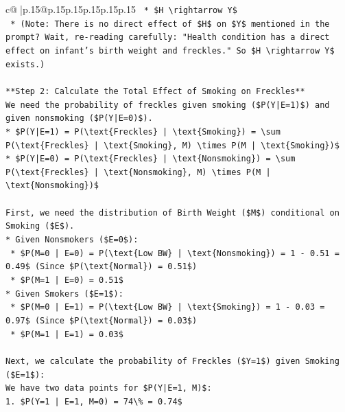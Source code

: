 \documentclass{article}
\begin{document}
{\begin{supertabular}{c@{$\;$}|p{.15\linewidth}@{}p{.15\linewidth}p{.15\linewidth}p{.15\linewidth}p{.15\linewidth}p{.15\linewidth}}
{{{\texttt{    *   \$H \textbackslash{}rightarrow Y\$} \\
\texttt{    *   (Note: There is no direct effect of \$H\$ on \$Y\$ mentioned in the prompt? Wait, re{-}reading carefully: "Health condition has a direct effect on infant's birth weight and freckles." So \$H \textbackslash{}rightarrow Y\$ exists.)} \\
\\ 
\texttt{**Step 2: Calculate the Total Effect of Smoking on Freckles**} \\
\texttt{We need the probability of freckles given smoking (\$P(Y|E=1)\$) and given nonsmoking (\$P(Y|E=0)\$).} \\
\texttt{*   \$P(Y|E=1) = P(\textbackslash{}text\{Freckles\} | \textbackslash{}text\{Smoking\}) = \textbackslash{}sum P(\textbackslash{}text\{Freckles\} | \textbackslash{}text\{Smoking\}, M) \textbackslash{}times P(M | \textbackslash{}text\{Smoking\})\$} \\
\texttt{*   \$P(Y|E=0) = P(\textbackslash{}text\{Freckles\} | \textbackslash{}text\{Nonsmoking\}) = \textbackslash{}sum P(\textbackslash{}text\{Freckles\} | \textbackslash{}text\{Nonsmoking\}, M) \textbackslash{}times P(M | \textbackslash{}text\{Nonsmoking\})\$} \\
\\ 
\texttt{First, we need the distribution of Birth Weight (\$M\$) conditional on Smoking (\$E\$).} \\
\texttt{*   Given Nonsmokers (\$E=0\$):} \\
\texttt{    *   \$P(M=0 | E=0) = P(\textbackslash{}text\{Low BW\} | \textbackslash{}text\{Nonsmoking\}) = 1 {-} 0.51 = 0.49\$ (Since \$P(\textbackslash{}text\{Normal\}) = 0.51\$)} \\
\texttt{    *   \$P(M=1 | E=0) = 0.51\$} \\
\texttt{*   Given Smokers (\$E=1\$):} \\
\texttt{    *   \$P(M=0 | E=1) = P(\textbackslash{}text\{Low BW\} | \textbackslash{}text\{Smoking\}) = 1 {-} 0.03 = 0.97\$ (Since \$P(\textbackslash{}text\{Normal\}) = 0.03\$)} \\
\texttt{    *   \$P(M=1 | E=1) = 0.03\$} \\
\\ 
\texttt{Next, we calculate the probability of Freckles (\$Y=1\$) given Smoking (\$E=1\$):} \\
\texttt{We have two data points for \$P(Y|E=1, M)\$:} \\
\texttt{1.  \$P(Y=1 | E=1, M=0) = 74\textbackslash{}\% = 0.74\$} \\
}}}
\end{supertabular}}
\end{document}
